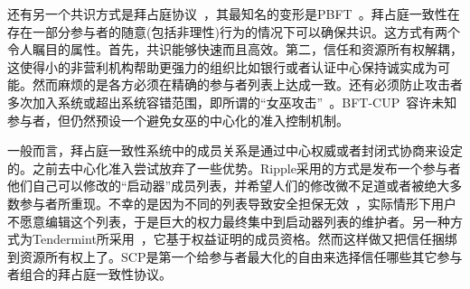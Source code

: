 还有另一个共识方式是拜占庭协议~\cite{Pease:1980:RAP:322186.322188,Lamport:1982:BGP:357172.357176}，其最知名的变形是PBFT~\cite{Castro:1999:PBFT}。拜占庭一致性在存在一部分参与者的随意(包括非理性)行为的情况下可以确保共识。这方式有两个令人瞩目的属性。首先，共识能够快速而且高效。第二，信任和资源所有权解耦，这使得小的非营利机构帮助更强力的组织比如银行或者认证中心保持诚实成为可能。然而麻烦的是各方必须在精确的参与者列表上达成一致。还有必须防止攻击者多次加入系统或超出系统容错范围，即所谓的``女巫攻击''~\cite{Douceur:2002:SA:646334.687813}。BFT-CUP~\cite{Alchieri:2008:BCU:1496310.1496316}容许未知参与者，但仍然预设一个避免女巫的中心化的准入控制机制。

一般而言，拜占庭一致性系统中的成员关系是通过中心权威或者封闭式协商来设定的。之前去中心化准入尝试放弃了一些优势。Ripple采用的方式是发布一个参与者他们自己可以修改的``启动器''成员列表，并希望人们的修改微不足道或者被绝大多数参与者所重现。不幸的是因为不同的列表导致安全担保无效~\cite{ripple2014}，实际情形下用户不愿意编辑这个列表，于是巨大的权力最终集中到启动器列表的维护者。另一种方式为Tendermint所采用~\cite{tendermint2014}，它基于权益证明的成员资格。然而这样做又把信任捆绑到资源所有权上了。SCP是第一个给参与者最大化的自由来选择信任哪些其它参与者组合的拜占庭一致性协议。